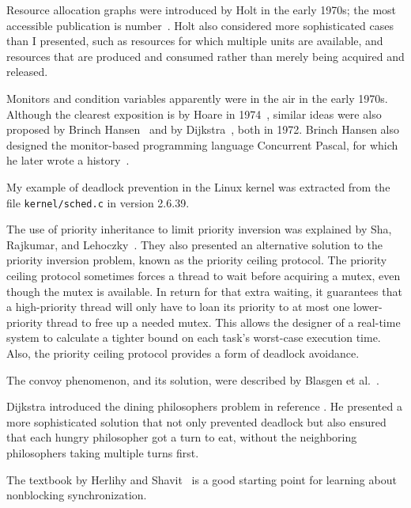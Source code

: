 Resource allocation graphs were
introduced by Holt in the early
1970s; the most accessible publication is number~\cite{max990}.  Holt also
considered more sophisticated cases than I presented, such as
resources for which multiple units are available, and resources that
are produced and consumed rather than merely being acquired and
released.

Monitors and condition variables apparently were in the air in the
early 1970s.  Although the clearest exposition is by Hoare in
1974~\cite{max991}, similar ideas were also proposed by Brinch
Hansen~\cite{max992} and by Dijkstra~\cite{max993}, both in 1972.  Brinch Hansen also
designed the monitor-based programming language Concurrent Pascal, for
which he
later wrote a history~\cite{max1172}.

My example of deadlock prevention in the Linux kernel was extracted
from the file \verb|kernel/sched.c| in version 2.6.39.

The use of priority inheritance to limit priority inversion was
explained by  Sha, Rajkumar, and Lehoczky~\cite{max1171}.  They also
presented an alternative solution to the priority inversion problem,
known as the priority ceiling protocol.  The priority ceiling protocol
sometimes forces a thread to wait before acquiring a mutex, even
though the mutex is available.  In return for that extra waiting, it guarantees that
a high-priority thread will only have to loan its priority to at most one
lower-priority thread to free up a needed mutex.  This allows the
designer of a real-time system to calculate a tighter bound on each
task's worst-case execution time.  Also, the priority
ceiling protocol provides a form of deadlock avoidance.

The convoy phenomenon, and its solution, were
described by Blasgen
et al.~\cite{max1010}.

Dijkstra introduced the dining philosophers problem in reference \cite{max993}.
He presented a more sophisticated solution that not only prevented
deadlock but also ensured that each hungry philosopher got a turn to
eat, without the neighboring philosophers taking multiple turns first.

The textbook by Herlihy and Shavit~\cite{max1202} is a good starting point for learning about nonblocking synchronization.


